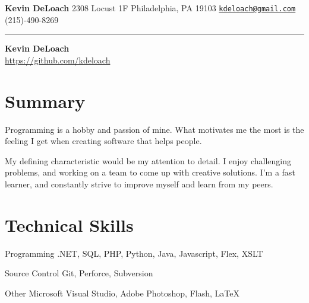 \documentclass[11pt]{article}
\newcommand{\spacer}{\hspace{\stretch{1}}\textbullet\hspace{\stretch{1}}}
\begin{document}
\begin{center}
    \textbf{Kevin DeLoach} \spacer
    2308 Locust 1F         \spacer
    Philadelphia, PA 19103 \spacer
    \href{mailto:kdeloach@gmail.com}{\texttt{kdeloach@gmail.com}} \spacer
    (215)-490-8269
\end{center}

\vspace{-0.5em}
\hrule
\vspace{2em}

\noindent
{\Huge\bfseries Kevin DeLoach} \\
\url{https://github.com/kdeloach}

\section*{Summary}

Programming is a hobby and passion of mine. 
What motivates me the most is the feeling I get when creating software that helps people.


My defining characteristic would be my attention to detail.
I enjoy challenging problems, and working on a team to come up with creative solutions. 
I'm a fast learner, and constantly strive to improve myself and learn from my peers.

\section*{Technical Skills}
\begin{description*}
    \item[Programming]%
        .NET, SQL, PHP, Python, Java, Javascript, Flex, XSLT
    \item[Source Control]%
        Git, Perforce, Subversion
    \item[Other]%
        Microsoft Visual Studio, Adobe Photoshop, Flash, \LaTeX
\end{description*}
\end{document}

